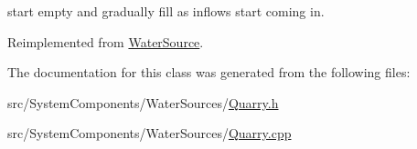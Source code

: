 start empty and gradually fill as inflows start coming in. 

Reimplemented from \mbox{\hyperlink{classWaterSource_ab3396e2915db91a6c82e0f29c7889df4}{Water\+Source}}.



The documentation for this class was generated from the following files\+:\begin{DoxyCompactItemize}
\item 
src/\+System\+Components/\+Water\+Sources/\mbox{\hyperlink{Quarry_8h}{Quarry.\+h}}\item 
src/\+System\+Components/\+Water\+Sources/\mbox{\hyperlink{Quarry_8cpp}{Quarry.\+cpp}}\end{DoxyCompactItemize}
